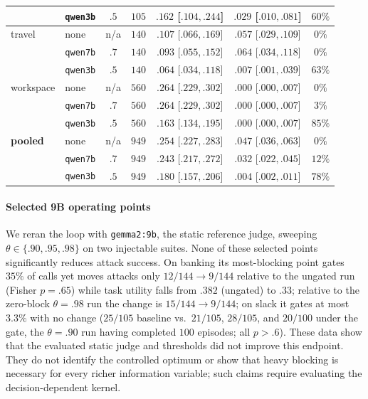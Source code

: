 \begin{table}[h]
\begin{tabular}{@{}llccccc@{}}
      & \texttt{qwen3b} & $.5$ & $105$ & $.162$ [$.104,.244$] & $.029$ [$.010,.081$] & $60\%$ \\
\midrule
travel & none & n/a & $140$ & $.107$ [$.066,.169$] & $.057$ [$.029,.109$] & $0\%$ \\
       & \texttt{qwen7b} & $.7$ & $140$ & $.093$ [$.055,.152$] & $.064$ [$.034,.118$] & $0\%$ \\
       & \texttt{qwen3b} & $.5$ & $140$ & $.064$ [$.034,.118$] & $.007$ [$.001,.039$] & $63\%$ \\
\midrule
workspace & none & n/a & $560$ & $.264$ [$.229,.302$] & $.000$ [$.000,.007$] & $0\%$ \\
       & \texttt{qwen7b} & $.7$ & $560$ & $.264$ [$.229,.302$] & $.000$ [$.000,.007$] & $3\%$ \\
       & \texttt{qwen3b} & $.5$ & $560$ & $.163$ [$.134,.195$] & $.000$ [$.000,.007$] & $85\%$ \\
\midrule
\textbf{pooled} & none & n/a & $949$ & $.254$ [$.227,.283$] & $.047$ [$.036,.063$] & $0\%$ \\
       & \texttt{qwen7b} & $.7$ & $949$ & $.243$ [$.217,.272$] & $.032$ [$.022,.045$] & $12\%$ \\
       & \texttt{qwen3b} & $.5$ & $949$ & $.180$ [$.157,.206$] & $.004$ [$.002,.011$] & $78\%$ \\
\bottomrule
\end{tabular}
\end{table}

\paragraph{Selected 9B operating points} We reran the loop with
\texttt{gemma2:9b}, the static reference judge, sweeping
$\theta\in\{.90,.95,.98\}$ on two injectable suites. None of these selected
points significantly reduces attack success. On banking its most-blocking point gates $35\%$ of calls yet moves attacks
only $12/144\to9/144$ relative to the ungated run (Fisher $p=.65$) while task utility
falls from $.382$ (ungated) to $.33$; relative to the zero-block $\theta=.98$ run the
change is $15/144\to9/144$; on slack it
gates at most $3.3\%$ with no change ($25/105$ baseline vs.\ $21/105$, $28/105$, and $20/100$ under the gate, the $\theta=.90$ run having completed $100$ episodes; all
$p>.6$). These data show that the evaluated static judge and thresholds did
not improve this endpoint. They do not identify the controlled optimum or show
that heavy blocking is necessary for every richer information variable; such
claims require evaluating the decision-dependent kernel.

